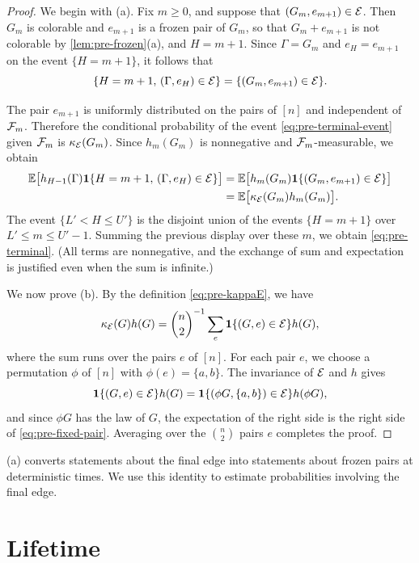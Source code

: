 \begin{proof}
We begin with (a). Fix $m \ge 0$, and suppose that $(G_m, e_{m + 1}) \in \mathcal E$. Then $G_m$ is colorable and $e_{m + 1}$ is a frozen pair of $G_m$, so that $G_m + e_{m + 1}$ is not colorable by \cref{lem:pre-frozen}(a), and $H = m + 1$. Since $\Gamma = G_m$ and $e_H = e_{m + 1}$ on the event $\{H = m + 1\}$, it follows that
\begin{equation}\label{eq:pre-terminal-event}
\{H = m + 1, \, (\Gamma, e_H) \in \mathcal E\} = \{(G_m, e_{m + 1}) \in \mathcal E\}.
\end{equation}

The pair $e_{m + 1}$ is uniformly distributed on the pairs of $[n]$ and independent of $\mathcal F_m$. Therefore the conditional probability of the event \eqref{eq:pre-terminal-event} given $\mathcal F_m$ is $\kappa_{\mathcal E}(G_m)$. Since $h_m(G_m)$ is nonnegative and $\mathcal F_m$-measurable, we obtain
\[
\begin{aligned}
\mathbb E\big[h_{H - 1}(\Gamma) \mathbf 1\{H = m + 1, \, (\Gamma, e_H) \in \mathcal E\}\big] &= \mathbb E\big[h_m(G_m) \mathbf 1\{(G_m, e_{m + 1}) \in \mathcal E\}\big]\\
&= \mathbb E\big[\kappa_{\mathcal E}(G_m) h_m(G_m)\big].
\end{aligned}
\]
The event $\{L' < H \le U'\}$ is the disjoint union of the events $\{H = m + 1\}$ over $L' \le m \le U' - 1$. Summing the previous display over these $m$, we obtain \eqref{eq:pre-terminal}. (All terms are nonnegative, and the exchange of sum and expectation is justified even when the sum is infinite.)

We now prove (b). By the definition \eqref{eq:pre-kappaE}, we have
\[
\kappa_{\mathcal E}(G) h(G) = \binom{n}{2}^{-1} \sum_{e} \mathbf 1\{(G, e) \in \mathcal E\} h(G),
\]
where the sum runs over the pairs $e$ of $[n]$. For each pair $e$, we choose a permutation $\phi$ of $[n]$ with $\phi(e) = \{a, b\}$. The invariance of $\mathcal E$ and $h$ gives
\[
\mathbf 1\{(G, e) \in \mathcal E\} h(G) = \mathbf 1\{(\phi G, \{a, b\}) \in \mathcal E\} h(\phi G),
\]
and since $\phi G$ has the law of $G$, the expectation of the right side is the right side of \eqref{eq:pre-fixed-pair}. Averaging over the $\binom{n}{2}$ pairs $e$ completes the proof.
\end{proof}

(a) converts statements about the final edge into statements about frozen pairs at deterministic times. We use this identity to estimate probabilities involving the final edge.

\section{Lifetime}\label{sec:pre-lifetime}

